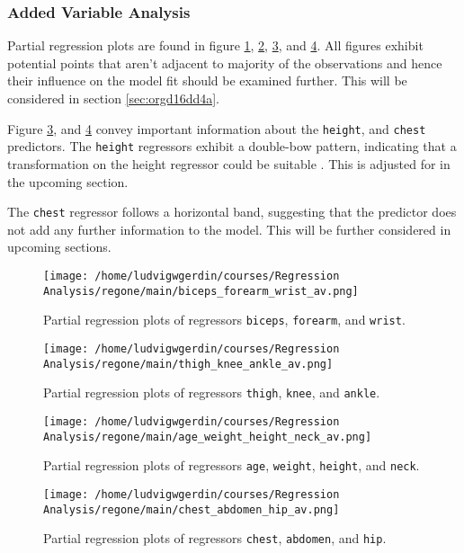 \documentclass[11pt]{article}
\begin{document}
\subsubsection{Added Variable Analysis}
\label{sec:org14d8c94}

Partial regression plots are found in figure \ref{fig:org5bb7a00}, \ref{fig:org3c6a1e2},
\ref{fig:org168be33}, and \ref{fig:org4cf52d5}. All figures exhibit potential points 
that aren't adjacent to majority of the observations and hence their influence on the model fit should be 
examined further. This will be considered in section \ref{sec:orgd16dd4a}.

Figure \ref{fig:org168be33}, and \ref{fig:org4cf52d5} 
convey important information about the \texttt{height}, and \texttt{chest} predictors.
The \texttt{height} regressors exhibit a double-bow pattern, indicating that a transformation on 
the height regressor could be suitable \cite{Montgomery2012}. This is adjusted for in the upcoming section.

The \texttt{chest} regressor follows  a horizontal band, suggesting that the predictor does not add any
further information to the model. \cite{Montgomery2012} This will be further considered in upcoming sections.

\begin{figure}[htbp]
\centering
\texttt{[image: /home/ludvigwgerdin/courses/Regression Analysis/regone/main/biceps\_forearm\_wrist\_av.png]}
\caption{\label{fig:org5bb7a00}
Partial regression plots of regressors \texttt{biceps}, \texttt{forearm}, and \texttt{wrist}.}
\end{figure}   

\begin{figure}[htbp]
\centering
\texttt{[image: /home/ludvigwgerdin/courses/Regression Analysis/regone/main/thigh\_knee\_ankle\_av.png]}
\caption{\label{fig:org3c6a1e2}
Partial regression plots of regressors \texttt{thigh}, \texttt{knee}, and \texttt{ankle}.}
\end{figure}

\begin{figure}[htbp]
\centering
\texttt{[image: /home/ludvigwgerdin/courses/Regression Analysis/regone/main/age\_weight\_height\_neck\_av.png]}
\caption{\label{fig:org168be33}
Partial regression plots of regressors \texttt{age}, \texttt{weight}, \texttt{height}, and \texttt{neck}.}
\end{figure}

\begin{figure}[htbp]
\centering
\texttt{[image: /home/ludvigwgerdin/courses/Regression Analysis/regone/main/chest\_abdomen\_hip\_av.png]}
\caption{\label{fig:org4cf52d5}
Partial regression plots of regressors \texttt{chest}, \texttt{abdomen}, and \texttt{hip}.}
\end{figure}
\end{document}
